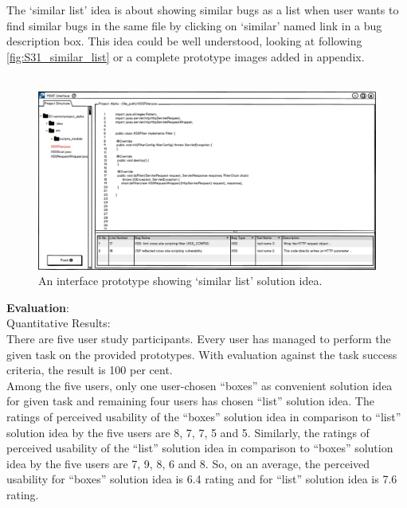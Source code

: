 The ‘similar list’ idea is about showing similar bugs as a list when user wants to find similar bugs in the same file by clicking on ‘similar’ named link in a bug description box. This idea could be well understood, looking at following \autoref{fig:S31_similar_list} or a complete prototype images added in appendix. \\ \\


\begin{figure}[hbt!]
	\centering
	\includegraphics[width=\linewidth]{figures/solution_ideas_snaps/S31_similar_list}
	\caption{An interface prototype showing ‘similar list’ solution idea.}
	\label{fig:S31_similar_list}
\end{figure} 


\textbf{Evaluation}: \\

Quantitative Results: \\

There are five user study participants. Every user has managed to perform the given task on the provided prototypes. With evaluation against the task success criteria, the result is 100 per cent. \\

Among the five users, only one user-chosen “boxes” as convenient solution idea for given task and remaining four users has chosen “list” solution idea. The ratings of perceived usability of the “boxes” solution idea in comparison to “list” solution idea by the five users are 8, 7, 7, 5 and 5. Similarly, the ratings of perceived usability of the “list” solution idea in comparison to “boxes” solution idea by the five users are 7, 9, 8, 6 and 8. So, on an average, the perceived usability for “boxes” solution idea is 6.4 rating and for “list” solution idea is 7.6 rating. \\

